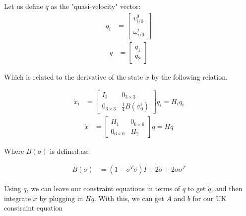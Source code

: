 \documentclass{article}
\begin{document}
Let us define $q$ as the "quasi-velocity" vector:
\begin{align}
    q_i &=
    \begin{bmatrix}
        v_{i/0}^0 \\
        \omega_{i/0}^i
    \end{bmatrix}
\end{align}
\begin{align}
    q &=
    \begin{bmatrix}
        q_1 \\
        q_2
    \end{bmatrix}
\end{align}

Which is related to the derivative of the state $\dot{x}$ by the following relation.

\begin{align}
    \dot{x}_i &=
    \begin{bmatrix}
        I_3 & 0_{3 \times 3} \\
        0_{3 \times 3} & \frac{1}{4} B(\sigma_0^i)
    \end{bmatrix} q_i = H_iq_i
\end{align}
\begin{align}
    \dot{x} &=
    \begin{bmatrix}
        H_1 & 0_{6 \times 6} \\
        0_{6 \times 6} & H_2
    \end{bmatrix} q = Hq
\end{align}

Where $B(\sigma)$ is defined as:

\begin{align}
    B(\sigma) &= (1 - \sigma^T\sigma)I + 2\tilde{\sigma} + 2\sigma\sigma^T
\end{align}

Using $q$, we can leave our constraint equations in terms of $q$ to get $\dot{q}$, and
then integrate $x$ by plugging in $Hq$.  With this, we can get $A$ and $b$ for our UK
constraint equation
\end{document}

